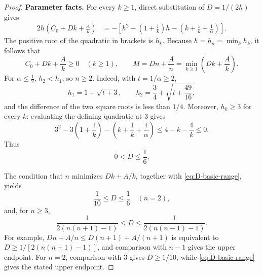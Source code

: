 \documentclass[11pt]{article}
\theoremstyle{remark}
\begin{document}
\begin{proof}
\medskip
\noindent
\textbf{Parameter facts.}
For every $k\geq1$, direct substitution of $D=1/(2h)$ gives
\begin{align}
 2h\left(C_0+Dk+\frac Ak\right)
 &=-\left[h^2-\left(1+\frac1k\right)h
              -\left(k+\frac1k+\frac1\alpha\right)\right].
 \label{eq:canonical-envelope-calculation}
\end{align}
The positive root of the quadratic in brackets is $h_k$.  Because
$h=h_n=\min_kh_k$, it follows that
\begin{equation}\label{eq:canonical-envelope}
 C_0+Dk+\frac Ak\geq0\quad(k\geq1),
 \qquad
 M=Dn+\frac An=\min_{k\geq1}\left(Dk+\frac Ak\right).
\end{equation}
For $\alpha\leq\tfrac12$, $h_2<h_1$, so $n\geq2$.  Indeed,
with $t=1/\alpha\geq2$,
\[
 h_1=1+\sqrt{t+3},\qquad
 h_2=\frac34+\sqrt{t+\frac{49}{16}},
\]
and the difference of the two square roots is less than $1/4$.
Moreover, $h_k\geq3$ for every $k$: evaluating the defining
quadratic at $3$ gives
\[
 3^2-3\left(1+\frac1k\right)
   -\left(k+\frac1k+\frac1\alpha\right)
 \leq4-k-\frac4k\leq0.
\]
Thus
\begin{equation}\label{eq:D-basic-range}
 0<D\leq\frac16.
\end{equation}

The condition that $n$ minimizes $Dk+A/k$, together with
\eqref{eq:D-basic-range}, yields
\begin{equation}\label{eq:active-D-range}
 \frac1{10}\leq D\leq\frac16\quad(n=2),
\end{equation}
and, for $n\geq3$,
\begin{equation}\label{eq:active-D-range-large-n}
 \frac1{2(n(n+1)-1)}\leq D
 \leq\frac1{2(n(n-1)-1)}.
\end{equation}
For example, $Dn+A/n\leq D(n+1)+A/(n+1)$ is equivalent to
$D\geq1/[2(n(n+1)-1)]$, and comparison with $n-1$ gives the
upper endpoint.  For $n=2$, comparison with $3$ gives $D\geq1/10$,
while \eqref{eq:D-basic-range} gives the stated upper endpoint.


\end{proof}
\end{document}
